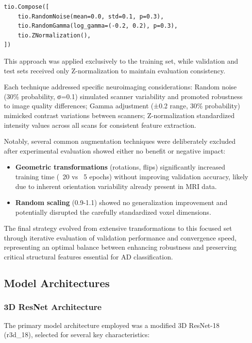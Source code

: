 \documentclass[12pt, a4paper]{article}
\begin{document}
\begin{verbatim}
tio.Compose([
    tio.RandomNoise(mean=0.0, std=0.1, p=0.3),
    tio.RandomGamma(log_gamma=(-0.2, 0.2), p=0.3),
    tio.ZNormalization(),
])
\end{verbatim}

This approach was applied exclusively to the training set, while validation and test sets received only Z-normalization to maintain evaluation consistency.


Each technique addressed specific neuroimaging considerations: Random noise (30\% probability, σ=0.1) simulated scanner variability and promoted robustness to image quality differences; Gamma adjustment (±0.2 range, 30\% probability) mimicked contrast variations between scanners; Z-normalization standardized intensity values across all scans for consistent feature extraction.

Notably, several common augmentation techniques were deliberately excluded after experimental evaluation showed either no benefit or negative impact:

\begin{itemize}
    \item \textbf{Geometric transformations} (rotations, flips) significantly increased training time (~20 vs ~5 epochs) without improving validation accuracy, likely due to inherent orientation variability already present in MRI data.
    
    \item \textbf{Random scaling} (0.9-1.1) showed no generalization improvement and potentially disrupted the carefully standardized voxel dimensions.
\end{itemize}

The final strategy evolved from extensive transformations to this focused set through iterative evaluation of validation performance and convergence speed, representing an optimal balance between enhancing robustness and preserving critical structural features essential for AD classification.
\subsection{Model Architectures}
\subsubsection{3D ResNet Architecture}

The primary model architecture employed was a modified 3D ResNet-18 (r3d\_18), selected for several key characteristics:
\end{document}
